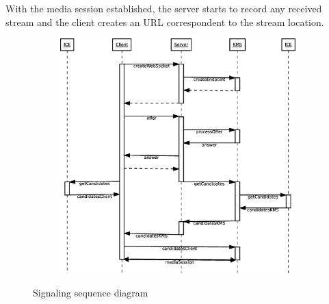 With the media session established, the server starts to record any received stream and the client creates an \ac{URL} correspondent to the stream location.

\begin{figure}[H]
    \centering
    \begin{subfigure}[b]{0.5pc}
    	\includegraphics[width=1.0\textwidth]{figures/signaling}
    \end{subfigure}
    \caption{Signaling sequence diagram}
\end{figure} 
